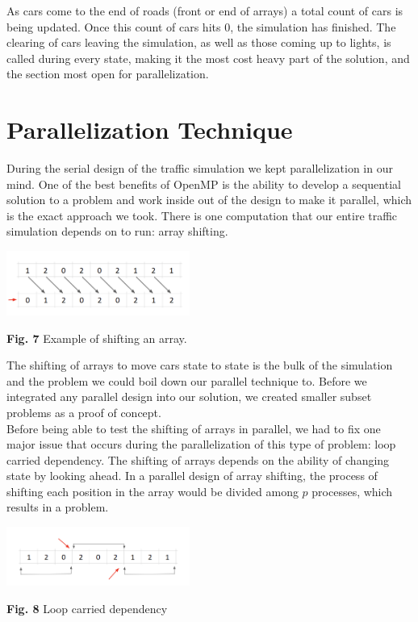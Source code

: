 \documentclass[conference]{IEEEtran}
\begin{document}
\hspace*{.2cm} As cars come to the end of roads (front or end of arrays) a total count of cars is being updated. Once this count of cars hits 0, the simulation has finished. The clearing of cars leaving the simulation, as well as those coming up to lights, is called during every state, making it the most cost heavy part of the solution, and the section most open for parallelization. 


\section{Parallelization Technique}
During the serial design of the traffic simulation we kept parallelization in our mind. One of the best benefits of OpenMP is the ability to develop a sequential solution to a problem and work inside out of the design to make it parallel, which is the exact approach we took. There is one computation that our entire traffic simulation depends on to run: array shifting. 

\includegraphics[width=0.45\textwidth]{arrayShift}
\begin{center}
	\textbf{Fig. 7} Example of shifting an array. \\
\end{center}

The shifting of arrays to move cars state to state is the bulk of the simulation and the problem we could boil down our parallel technique to. Before we integrated any parallel design into our solution, we created smaller subset problems as a proof of concept.  \\

\hspace*{.2cm} Before being able to test the shifting of arrays in parallel, we had to fix one major issue that occurs during the parallelization of this type of problem: loop carried dependency. The shifting of arrays depends on the ability of changing state by looking ahead. In a parallel design of array shifting, the process of shifting each position in the array would be divided among $p$ processes, which results in a problem.

\includegraphics[width=0.45\textwidth]{dependency}
\begin{center}
	\textbf{Fig. 8} Loop carried dependency \\
\end{center}
\end{document}
